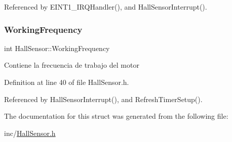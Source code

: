 Referenced by E\+I\+N\+T1\+\_\+\+I\+R\+Q\+Handler(), and Hall\+Sensor\+Interrupt().

\mbox{\label{structHallSensor_aa9598178f2fba9eae32ca1f27fedb76d}} 
\subsubsection{\texorpdfstring{Working\+Frequency}{WorkingFrequency}}
{\footnotesize\ttfamily int Hall\+Sensor\+::\+Working\+Frequency}

Contiene la frecuencia de trabajo del motor 

Definition at line 40 of file Hall\+Sensor.\+h.



Referenced by Hall\+Sensor\+Interrupt(), and Refresh\+Timer\+Setup().



The documentation for this struct was generated from the following file\+:\begin{DoxyCompactItemize}
\item 
inc/\hyperlink{HallSensor_8h}{Hall\+Sensor.\+h}\end{DoxyCompactItemize}
